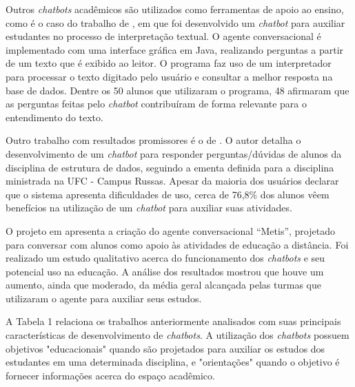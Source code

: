\documentclass[12pt]{article}
\begin{document}
Outros {\itshape chatbots} acadêmicos são utilizados como ferramentas de apoio ao ensino, como é o caso do trabalho de \cite{bulhoes:20}, em que  foi desenvolvido um {\itshape chatbot} para auxiliar estudantes no processo de interpretação textual. O agente conversacional é implementado com uma interface gráfica em Java, realizando perguntas a partir de um texto que é exibido ao leitor. O programa faz uso de um interpretador para processar o texto digitado pelo usuário e consultar a melhor resposta na base de dados. Dentre os 50 alunos que utilizaram o programa, 48 afirmaram que as perguntas feitas pelo  {\itshape chatbot} contribuíram de forma relevante para o entendimento do texto.

Outro trabalho com resultados promissores é o de \cite{araujo:20}. O autor detalha o desenvolvimento de um {\itshape chatbot} para responder perguntas/dúvidas de alunos da disciplina de estrutura de dados, seguindo a ementa definida para a disciplina ministrada na UFC - Campus Russas. Apesar da maioria dos usuários declarar que o sistema apresenta dificuldades de uso, cerca de 76,8\% dos alunos  vêem benefícios na utilização de um {\itshape chatbot} para auxiliar suas atividades.

O projeto em  \cite{lucchesi:18} apresenta a criação do agente conversacional “Metis”, projetado para conversar com alunos como apoio às atividades de educação a distância. Foi realizado um estudo qualitativo acerca do funcionamento dos {\itshape chatbots} e seu potencial uso na educação. A análise dos resultados mostrou que houve um aumento, ainda que moderado, da média geral alcançada pelas turmas que utilizaram o agente para auxiliar seus estudos.

A Tabela 1 relaciona os trabalhos anteriormente analisados com suas principais características de desenvolvimento de {\itshape chatbots}. A utilização dos {\itshape chatbots} possuem objetivos "educacionais" quando são projetados para auxiliar os estudos dos estudantes em uma determinada disciplina, e "orientações" quando o objetivo é fornecer informações acerca do espaço acadêmico.
\end{document}
